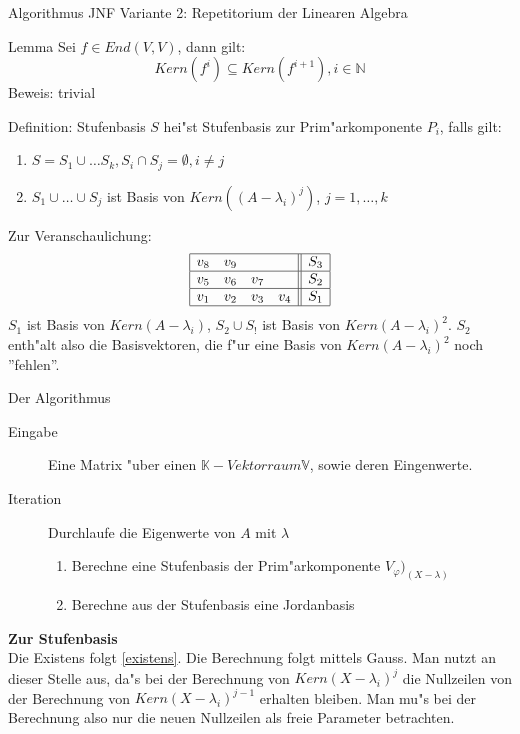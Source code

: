 \documentclass[a4paper]{article}
\begin{document}
\begin{section}{Algorithmus JNF Variante 2: Repetitorium der Linearen Algebra}
\begin{subsubsection}{Lemma}
Sei $f \in End(V,V)$, dann gilt:
$$Kern(f^i) \subseteq Kern(f^{i+1}), i \in \mathbb{N}$$
Beweis: trivial \label{existens}
\end{subsubsection}
\begin{subsubsection}{Definition: Stufenbasis}
$S$ hei"st Stufenbasis zur Prim"arkomponente $P_i$, falls gilt:
\begin{enumerate}
\item $S=S_1 \cup \ldots S_k, S_i \cap S_j = \emptyset, i \not= j$
\item $S_1 \cup \ldots \cup S_j $ ist Basis von $Kern((A-\lambda_i)^j)$, $j=1,\ldots,k$
\end{enumerate}
\end{subsubsection}
Zur Veranschaulichung:
$$
\begin{array}{|cccc||c|}
\hline
v_8 & v_9 &     &     & S_3\\\hline
v_5 & v_6 & v_7 &     & S_2\\\hline
v_1 & v_2 & v_3 & v_4 & S_1\\\hline
\end{array}
$$
$S_1$ ist Basis von $Kern(A-\lambda_i)$, $S_2 \cup S_!$ ist Basis von $Kern(A-\lambda_i)^2$. $S_2$ enth"alt also die Basisvektoren, die f"ur eine Basis von $Kern(A-\lambda_i)^2$ noch ''fehlen''.
\begin{subsection}{Der Algorithmus}
\begin{description}
\item[Eingabe] Eine Matrix "uber einen $\mathbb{K}-Vektorraum \mathbb{V}$, sowie deren Eingenwerte.
\item[Iteration] Durchlaufe die Eigenwerte von $A$ mit $\lambda$
\begin{enumerate}
\item Berechne eine Stufenbasis der Prim"arkomponente $V_\varphi)_{(X-\lambda)}$
\item Berechne aus der Stufenbasis eine Jordanbasis
\end{enumerate}
\end{description}
\textbf{Zur Stufenbasis}\\
Die Existens folgt \ref{existens}. Die Berechnung folgt mittels Gauss. Man nutzt an dieser Stelle aus, da"s bei der Berechnung von $Kern(X-\lambda_i)^j$ die Nullzeilen von der Berechnung von $Kern(X-\lambda_i)^{j-1}$ erhalten bleiben. Man mu"s bei der Berechnung also nur die neuen Nullzeilen als freie Parameter betrachten.\\

\end{subsection}
\end{section}
\end{document}
